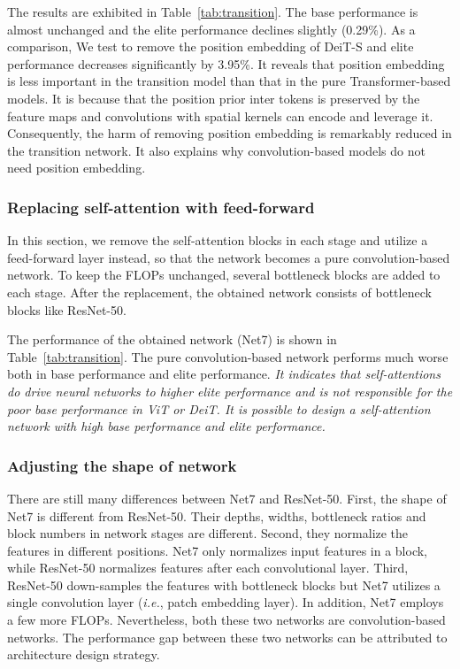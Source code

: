 \documentclass[10pt,twocolumn,letterpaper]{article}
\begin{document}
The results are exhibited in Table~\ref{tab:transition}. The base performance is almost unchanged and the elite performance declines slightly (0.29\%). As a comparison, We test to remove the position embedding of DeiT-S and elite performance decreases significantly by 3.95\%. It reveals that position embedding is less important in the transition model than that in the pure Transformer-based models. It is because that the position prior inter tokens is preserved by the feature maps and convolutions with spatial kernels can encode and leverage it. Consequently, the harm of removing position embedding is remarkably reduced in the transition network. It also explains why convolution-based models do not need position embedding.

\subsubsection{Replacing self-attention with feed-forward}
\label{methodology:transition:feedforward}

In this section, we remove the self-attention blocks in each stage and utilize a feed-forward layer instead, so that the network becomes a pure convolution-based network. To keep the FLOPs unchanged, several bottleneck blocks are added to each stage. After the replacement, the obtained network consists of bottleneck blocks like ResNet-50. 

The performance of the obtained network (Net7) is shown in Table~\ref{tab:transition}. The pure convolution-based network performs much worse both in base performance and elite performance. \textit{It indicates that self-attentions do drive neural networks to higher elite performance and is not responsible for the poor base performance in ViT or DeiT. It is possible to design a self-attention network with high base performance and elite performance.} 

\subsubsection{Adjusting the shape of network}
\label{methodology:transition:shape}

There are still many differences between Net7 and ResNet-50. First, the shape of Net7 is different from ResNet-50. Their depths, widths, bottleneck ratios and block numbers in network stages are different. Second, they normalize the features in different positions. Net7 only normalizes input features in a block, while ResNet-50 normalizes features after each convolutional layer. Third, ResNet-50 down-samples the features with bottleneck blocks but Net7 utilizes a single convolution layer (\textit{i.e.}, patch embedding layer). In addition, Net7 employs a few more FLOPs. Nevertheless, both these two networks are convolution-based networks. The performance gap between these two networks can be attributed to architecture design strategy. 
\end{document}
